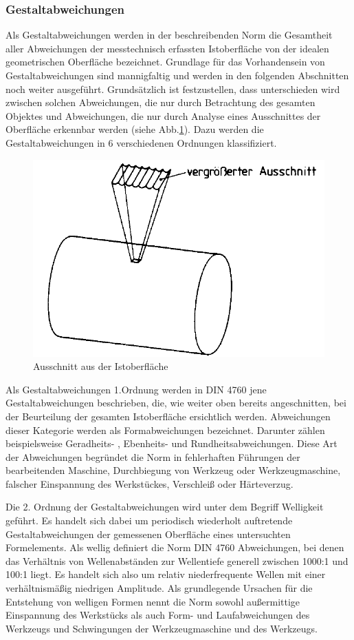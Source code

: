 \subsubsection{Gestaltabweichungen}

Als Gestaltabweichungen werden in der beschreibenden Norm die Gesamtheit aller Abweichungen der messtechnisch erfassten Istoberfläche von der idealen geometrischen Oberfläche bezeichnet. Grundlage für das Vorhandensein von Gestaltabweichungen sind mannigfaltig und werden in den folgenden Abschnitten noch weiter ausgeführt. Grundsätzlich ist festzustellen, dass unterschieden wird zwischen solchen Abweichungen, die nur durch Betrachtung des gesamten Objektes und Abweichungen, die nur durch Analyse eines Ausschnittes der Oberfläche erkennbar werden (siehe Abb.\ref{fig:din4760_1}). Dazu werden die Gestaltabweichungen in 6 verschiedenen Ordnungen klassifiziert. 


\begin{figure}[h]
	\centering
	\includegraphics[width=0.5\linewidth]{img/DIN_4760_1}
	\caption[Ausschnitt aus der Istoberfläche zur Beurteilung der Gestaltabweichung]{Ausschnitt aus der Istoberfläche}
	\label{fig:din4760_1}
\end{figure}

Als Gestaltabweichungen 1.Ordnung werden in DIN 4760 jene Gestaltabweichungen beschrieben, die, wie weiter oben bereits angeschnitten, bei der Beurteilung der gesamten Istoberfläche ersichtlich werden. Abweichungen dieser Kategorie werden als Formabweichungen bezeichnet. Darunter zählen beispielsweise Geradheits- , Ebenheits- und Rundheitsabweichungen. Diese Art der Abweichungen begründet die Norm in fehlerhaften Führungen der bearbeitenden Maschine, Durchbiegung von Werkzeug oder Werkzeugmaschine, falscher Einspannung des Werkstückes, Verschleiß oder Härteverzug.

Die 2. Ordnung der Gestaltabweichungen wird unter dem Begriff Welligkeit geführt. Es handelt sich dabei um periodisch wiederholt auftretende Gestaltabweichungen der gemessenen Oberfläche eines untersuchten Formelements. Als wellig definiert die Norm DIN 4760 Abweichungen, bei denen das Verhältnis von Wellenabständen zur Wellentiefe generell zwischen 1000:1 und 100:1 liegt. Es handelt sich also um relativ niederfrequente Wellen mit einer verhältnismäßig niedrigen Amplitude. Als grundlegende Ursachen für die Entstehung von welligen Formen nennt die Norm sowohl außermittige Einspannung des Werkstücks als auch Form- und Laufabweichungen des Werkzeugs und Schwingungen der Werkzeugmaschine und des Werkzeugs.

